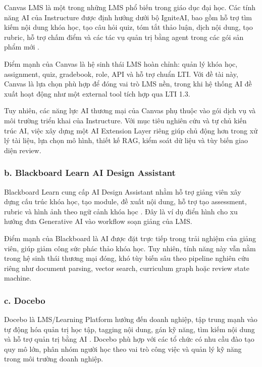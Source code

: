 Canvas LMS là một trong những LMS phổ biến trong giáo dục đại học. Các tính
năng AI của Instructure được định hướng dưới bộ IgniteAI, bao gồm hỗ trợ tìm
kiếm nội dung khóa học, tạo câu hỏi quiz, tóm tắt thảo luận, dịch nội dung,
tạo rubric, hỗ trợ chấm điểm và các tác vụ quản trị bằng agent trong các gói
sản phẩm mới \cite{instructure-ai}.

Điểm mạnh của Canvas là hệ sinh thái LMS hoàn chỉnh: quản lý khóa học,
assignment, quiz, gradebook, role, API và hỗ trợ chuẩn LTI. Với đề tài này,
Canvas là lựa chọn phù hợp để đóng vai trò LMS nền, trong khi hệ thống AI đề
xuất hoạt động như một external tool tích hợp qua LTI 1.3.

Tuy nhiên, các năng lực AI thương mại của Canvas phụ thuộc vào gói dịch vụ và
môi trường triển khai của Instructure. Với mục tiêu nghiên cứu và tự chủ kiến
trúc AI, việc xây dựng một AI Extension Layer riêng giúp chủ động hơn trong xử
lý tài liệu, lựa chọn mô hình, thiết kế RAG, kiểm soát dữ liệu và tùy biến giao
diện review.

\subsubsection*{b. Blackboard Learn AI Design Assistant}

Blackboard Learn cung cấp AI Design Assistant nhằm hỗ trợ giảng viên xây dựng
cấu trúc khóa học, tạo module, đề xuất nội dung, hỗ trợ tạo assessment, rubric
và hình ảnh theo ngữ cảnh khóa học \cite{blackboard-ai}.
Đây là ví dụ điển hình cho xu hướng đưa Generative AI vào workflow soạn giảng
của LMS.

Điểm mạnh của Blackboard là AI được đặt trực tiếp trong trải nghiệm của giảng
viên, giúp giảm công sức phác thảo khóa học. Tuy nhiên, tính năng này vẫn nằm
trong hệ sinh thái thương mại đóng, khó tùy biến sâu theo pipeline nghiên cứu
riêng như document parsing, vector search, curriculum graph hoặc review state
machine.

\subsubsection*{c. Docebo}

Docebo là LMS/Learning Platform hướng đến doanh nghiệp, tập trung mạnh vào tự
động hóa quản trị học tập, tagging nội dung, gán kỹ năng, tìm kiếm nội dung và
hỗ trợ quản trị bằng AI \cite{docebo-ai}.
Docebo phù hợp với các tổ chức có nhu cầu đào tạo quy mô lớn, phân nhóm người
học theo vai trò công việc và quản lý kỹ năng trong môi trường doanh nghiệp.

